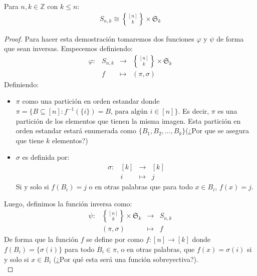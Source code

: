 \documentclass[12pt,a4paper,oneside]{memoir}
\DeclareRobustCommand{\stirling}{\genfrac\{\}{0pt}{}}
\begin{document}
\begin{theorem}
    Para $n, k \in \mathbb{Z}$ con $k \le n$:
    \begin{align*}
        S_{n, k} \cong \stirling{[n]}{k} \times \mathfrak{S}_k
    \end{align*}
\end{theorem}
\begin{proof}
    Para hacer esta demostración tomaremos dos funciones $\varphi$ y $\psi$ de forma que sean inversas. Empecemos definiendo:
    $$\begin{matrix}
        \varphi: & S_{n, k} & \to & \stirling{[n]}{k} \times \mathfrak{S}_k\\
        & f & \mapsto & (\pi, \sigma)
    \end{matrix}$$
    Definiendo:
    \begin{itemize}
        \item $\pi$ como una partición en orden estandar donde $\pi = \{B \subseteq [n] : f^{-1}(\{i\}) = B\text{, para algún $i \in [n]$}\}$. Es decir, $\pi$ es una partición de los elementos que tienen la misma imagen. Esta partición en orden estandar estará enumerada como $\{B_1, B_2, \dots, B_k\}$(¿Por que se asegura que tiene $k$ elementos?)
        \item $\sigma$ es definida por:
        $$\begin{matrix}
            \sigma: & [k] &\to &[k]\\
            & i & \mapsto & j
        \end{matrix}$$
        Si y solo si $f(B_i) = j$ o en otras palabras que para todo $x \in B_i$, $f(x) = j$.
    \end{itemize}

    Luego, definimos la función inversa como:
    $$\begin{matrix}
        \psi: & \stirling{[n]}{k} \times \mathfrak{S}_k & \to & S_{n, k}\\
        & (\pi, \sigma) &\mapsto & f
    \end{matrix}$$
    De forma que la función $f$ se define por como $f:[n] \to [k]$ donde $f(B_i) = \{\sigma(i)\}$ para todo $B_i \in \pi$, o en otras palabras, que $f(x) = \sigma(i)$ si y solo si $x \in B_i$ (¿Por qué esta será una función sobreyectiva?).\\


\end{proof}
\end{document}
